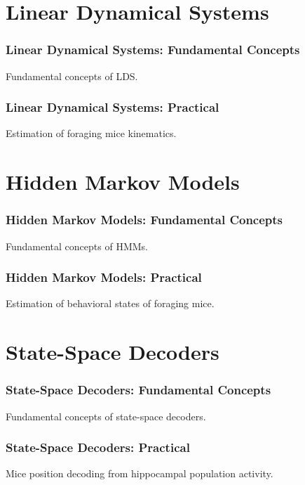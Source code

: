 \documentclass{beamer}
\begin{document}
\section{Linear Dynamical Systems}

\begin{frame}
    \frametitle{Linear Dynamical Systems: Fundamental Concepts}

    Fundamental concepts of LDS.

\end{frame}

\begin{frame}
    \frametitle{Linear Dynamical Systems: Practical}

    Estimation of foraging mice kinematics.

\end{frame}

\section{Hidden Markov Models}

\begin{frame}
    \frametitle{Hidden Markov Models: Fundamental Concepts}

    Fundamental concepts of HMMs.

\end{frame}

\begin{frame}
    \frametitle{Hidden Markov Models: Practical}

    Estimation of behavioral states of foraging mice.

\end{frame}

\section{State-Space Decoders}

\begin{frame}
    \frametitle{State-Space Decoders: Fundamental Concepts}

    Fundamental concepts of state-space decoders.

\end{frame}

\begin{frame}
    \frametitle{State-Space Decoders: Practical}

    Mice position decoding from hippocampal population activity.

\end{frame}
\end{document}
